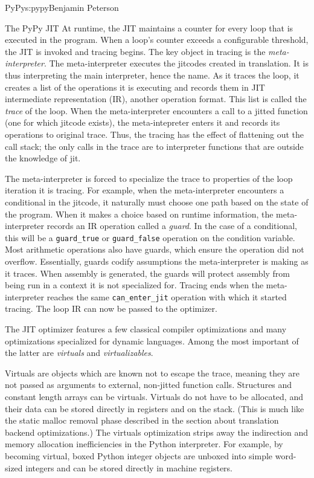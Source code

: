 \begin{aosachapter}{PyPy}{s:pypy}{Benjamin Peterson}
\begin{aosasect1}{The PyPy JIT}
At runtime, the JIT maintains a counter for every loop that is executed in the
program. When a loop's counter exceeds a configurable threshold, the JIT is
invoked and tracing begins. The key object in tracing is the
\emph{meta-interpreter}. The meta-interpreter executes the jitcodes created in
translation. It is thus interpreting the main interpreter, hence the name. As it
traces the loop, it creates a list of the operations it is executing and records
them in JIT intermediate representation (IR), another operation format. This
list is called the \emph{trace} of the loop. When the meta-interpreter
encounters a call to a jitted function (one for which jitcode exists), the
meta-intepreter enters it and records its operations to original trace. Thus,
the tracing has the effect of flattening out the call stack; the only calls in
the trace are to interpreter functions that are outside the knowledge of jit.

The meta-interpreter is forced to specialize the trace to properties of the loop
iteration it is tracing. For example, when the meta-interpreter encounters a
conditional in the jitcode, it naturally must choose one path based on the state
of the program. When it makes a choice based on runtime information, the
meta-interpreter records an IR operation called a \emph{guard}. In the case of a
conditional, this will be a \verb+guard_true+ or \verb+guard_false+ operation on
the condition variable. Most arithmetic operations also have guards, which
ensure the operation did not overflow. Essentially, guards codify assumptions
the meta-interpreter is making as it traces. When assembly is generated, the
guards will protect assembly from being run in a context it is not specialized
for. Tracing ends when the meta-interpreter reaches the same
\verb+can_enter_jit+ operation with which it started tracing. The loop IR can
now be passed to the optimizer.

The JIT optimizer features a few classical compiler optimizations and many
optimizations specialized for dynamic languages. Among the most important of the
latter are \emph{virtuals} and \emph{virtualizables}.

Virtuals are objects which are known not to escape the trace, meaning they are
not passed as arguments to external, non-jitted function calls. Structures and
constant length arrays can be virtuals. Virtuals do not have to be allocated,
and their data can be stored directly in registers and on the stack. (This is
much like the static malloc removal phase described in the section about
translation backend optimizations.) The virtuals optimization strips away the
indirection and memory allocation inefficiencies in the Python interpreter. For
example, by becoming virtual, boxed Python integer objects are unboxed into
simple word-sized integers and can be stored directly in machine registers.


\end{aosasect1}
\end{aosachapter}
